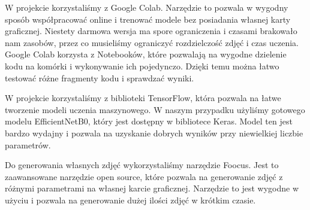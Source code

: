 W projekcie korzystaliśmy z Google Colab. Narzędzie to pozwala w wygodny sposób współpracować online i trenować modele bez posiadania własnej karty graficznej. Niestety darmowa wersja ma spore ograniczenia i czasami brakowało nam zasobów, przez co musieliśmy ograniczyć rozdzielczość zdjęć i czas uczenia. Google Colab korzysta z Notebooków, które pozwalają na wygodne dzielenie kodu na komórki i wykonywanie ich pojedynczo. Dzięki temu można łatwo testować różne fragmenty kodu i sprawdzać wyniki.

W projekcie korzystaliśmy z biblioteki TensorFlow, która pozwala na łatwe tworzenie modeli uczenia maszynowego. W naszym przypadku użyliśmy gotowego modelu EfficientNetB0, który jest dostępny w bibliotece Keras. Model ten jest bardzo wydajny i pozwala na uzyskanie dobrych wyników przy niewielkiej liczbie parametrów.

Do generowania własnych zdjęć wykorzystaliśmy narzędzie Foocus. Jest to zaawansowane narzędzie open source, które pozwala na generowanie zdjęć z różnymi parametrami na własnej karcie graficznej. Narzędzie to jest wygodne w użyciu i pozwala na generowanie dużej ilości zdjęć w krótkim czasie.
